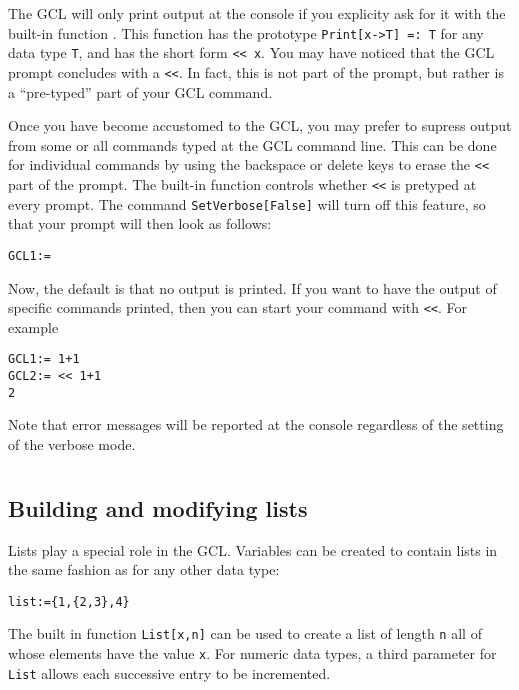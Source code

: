 The GCL will only print output at the console if you explicity ask for
it with the built-in function .  This function has the
prototype \verb+Print[x->T] =: T+ for any data type \verb+T+, and has
the short form \verb+<< x+.  You may have noticed that the GCL prompt
concludes with a \verb+<<+.  In fact, this is not part of the prompt,
but rather is a ``pre-typed'' part of your GCL command.  

Once you have become accustomed to the GCL, you may prefer to supress
output from some or all commands typed at the GCL command line.  This
can be done for individual commands by using the backspace or delete
keys to erase the \verb+<<+  part of the prompt.  The
built-in function  controls whether \verb+<<+ is
pretyped at every prompt.  The command \verb+SetVerbose[False]+ will
turn off this feature, so that your prompt will then look as
follows:

\begin{verbatim}
GCL1:= 
\end{verbatim}

Now, the default is that no output is printed.  If you want to have
the output of specific commands printed, then you can start your
command with \verb+<<+.  For example

\begin{verbatim}
GCL1:= 1+1
GCL2:= << 1+1
2
\end{verbatim}

Note that error messages will be reported at the console regardless of
the setting of the verbose mode.


\section{}

\subsection{Building and modifying lists}
Lists play a special role in the GCL.  Variables can be created to
contain lists in the same fashion as for any other data type:  

\begin{verbatim}
list:={1,{2,3},4}
\end{verbatim}

The built in function \verb+List[x,n]+ can be used to
create a list of length \verb+n+ all of whose elements have the value
\verb+x+.  For numeric data types, a third parameter for \verb+List+
allows each successive entry to be incremented.

